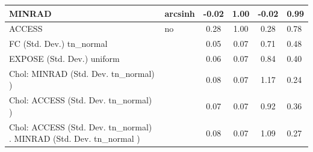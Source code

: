 \begin{table}
\begin{center}
\begin{tabular}{|l|l|c|c|c|l|}
			\hline
			MINRAD & arcsinh & -0.02 & 1.00 & -0.02 & 0.99 \\
			\hline
			ACCESS & no & 0.28 & 1.00 & 0.28 & 0.78 \\
			\hline
			FC (Std. Dev.) tn_normal &  & 0.05 & 0.07 & 0.71 & 0.48 \\
			\hline
			EXPOSE (Std. Dev.) uniform &  & 0.06 & 0.07 & 0.84 & 0.40 \\
			\hline
			 Chol: MINRAD (Std. Dev. tn_normal) ) &  & 0.08 & 0.07 & 1.17 & 0.24 \\
			\hline
			 Chol: ACCESS (Std. Dev. tn_normal) ) &  & 0.07 & 0.07 & 0.92 & 0.36 \\
			\hline
			 Chol: ACCESS (Std. Dev. tn_normal) . MINRAD (Std. Dev.   tn_normal ) &  & 0.08 & 0.07 & 1.09 & 0.27 \\
			\hline
		\end{tabular}
	\end{center}
\end{table}